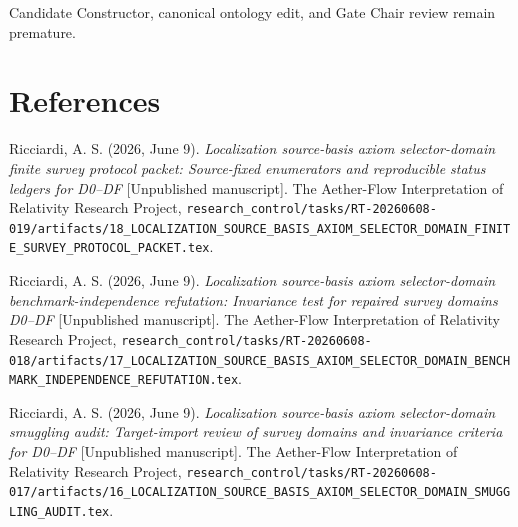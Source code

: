 \documentclass[11pt]{article}
\begin{document}
Candidate Constructor, canonical ontology edit, and Gate Chair review remain
premature.

\section*{References}

Ricciardi, A. S. (2026, June 9). \emph{Localization source-basis axiom
selector-domain finite survey protocol packet: Source-fixed enumerators and
reproducible status ledgers for D0--DF} [Unpublished manuscript]. The
Aether-Flow Interpretation of Relativity Research Project,
\texttt{research\_control/tasks/RT-20260608-019/artifacts/18\_LOCALIZATION\_SOURCE\_BASIS\_AXIOM\_SELECTOR\_DOMAIN\_FINITE\_SURVEY\_PROTOCOL\_PACKET.tex}.

Ricciardi, A. S. (2026, June 9). \emph{Localization source-basis axiom
selector-domain benchmark-independence refutation: Invariance test for
repaired survey domains D0--DF} [Unpublished manuscript]. The Aether-Flow
Interpretation of Relativity Research Project,
\texttt{research\_control/tasks/RT-20260608-018/artifacts/17\_LOCALIZATION\_SOURCE\_BASIS\_AXIOM\_SELECTOR\_DOMAIN\_BENCHMARK\_INDEPENDENCE\_REFUTATION.tex}.

Ricciardi, A. S. (2026, June 9). \emph{Localization source-basis axiom
selector-domain smuggling audit: Target-import review of survey domains and
invariance criteria for D0--DF} [Unpublished manuscript]. The Aether-Flow
Interpretation of Relativity Research Project,
\texttt{research\_control/tasks/RT-20260608-017/artifacts/16\_LOCALIZATION\_SOURCE\_BASIS\_AXIOM\_SELECTOR\_DOMAIN\_SMUGGLING\_AUDIT.tex}.
\end{document}
